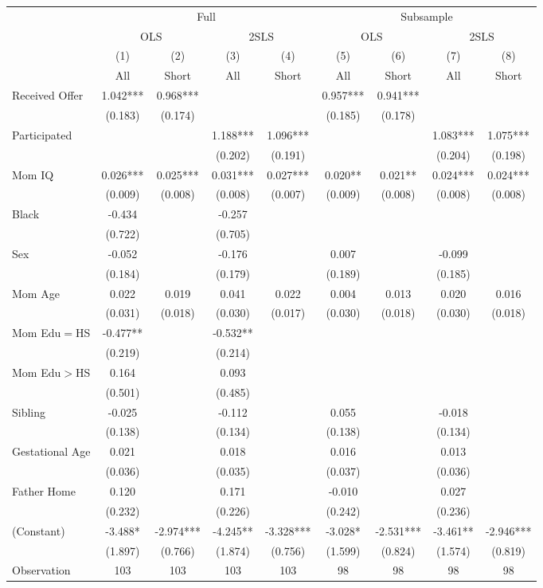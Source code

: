 \begin{tabular}{lcccccccc}
\toprule 
\midrule 
 & \multicolumn{4}{c}{Full} & \multicolumn{4}{c}{Subsample} \\
 \cmidrule(lr){2-5} \cmidrule(lr){6-9} 
 & \multicolumn{2}{c}{OLS} & \multicolumn{2}{c}{2SLS} & \multicolumn{2}{c}{OLS} & \multicolumn{2}{c}{2SLS} \\
 \cmidrule(lr){2-3} \cmidrule(lr){4-5} \cmidrule(lr){6-7} \cmidrule(lr){8-9} 
 & (1) & (2) & (3) & (4) & (5) & (6) & (7) & (8) \\
 & All & Short & All & Short & All & Short & All & Short \\
\midrule 
Received Offer & 1.042*** & 0.968*** &  &  & 0.957*** & 0.941*** &  &  \\
 & (0.183) & (0.174) &  &  & (0.185) & (0.178) &  &  \\
Participated &  &  & 1.188*** & 1.096*** &  &  & 1.083*** & 1.075*** \\
 &  &  & (0.202) & (0.191) &  &  & (0.204) & (0.198) \\
Mom IQ & 0.026*** & 0.025*** & 0.031*** & 0.027*** & 0.020** & 0.021** & 0.024*** & 0.024*** \\
 & (0.009) & (0.008) & (0.008) & (0.007) & (0.009) & (0.008) & (0.008) & (0.008) \\
Black & -0.434 &  & -0.257 &  &  &  &  &  \\
 & (0.722) &  & (0.705) &  &  &  &  &  \\
Sex & -0.052 &  & -0.176 &  & 0.007 &  & -0.099 &  \\
 & (0.184) &  & (0.179) &  & (0.189) &  & (0.185) &  \\
Mom Age & 0.022 & 0.019 & 0.041 & 0.022 & 0.004 & 0.013 & 0.020 & 0.016 \\
 & (0.031) & (0.018) & (0.030) & (0.017) & (0.030) & (0.018) & (0.030) & (0.018) \\
Mom Edu$=$HS & -0.477** &  & -0.532** &  &  &  &  &  \\
 & (0.219) &  & (0.214) &  &  &  &  &  \\
Mom Edu$>$HS & 0.164 &  & 0.093 &  &  &  &  &  \\
 & (0.501) &  & (0.485) &  &  &  &  &  \\
Sibling & -0.025 &  & -0.112 &  & 0.055 &  & -0.018 &  \\
 & (0.138) &  & (0.134) &  & (0.138) &  & (0.134) &  \\
Gestational Age & 0.021 &  & 0.018 &  & 0.016 &  & 0.013 &  \\
 & (0.036) &  & (0.035) &  & (0.037) &  & (0.036) &  \\
Father Home & 0.120 &  & 0.171 &  & -0.010 &  & 0.027 &  \\
 & (0.232) &  & (0.226) &  & (0.242) &  & (0.236) &  \\
(Constant) & -3.488* & -2.974*** & -4.245** & -3.328*** & -3.028* & -2.531*** & -3.461** & -2.946*** \\
 & (1.897) & (0.766) & (1.874) & (0.756) & (1.599) & (0.824) & (1.574) & (0.819) \\
\midrule 
Observation & 103 & 103 & 103 & 103 & 98 & 98 & 98 & 98 \\
\midrule 
\bottomrule 
\end{tabular}
